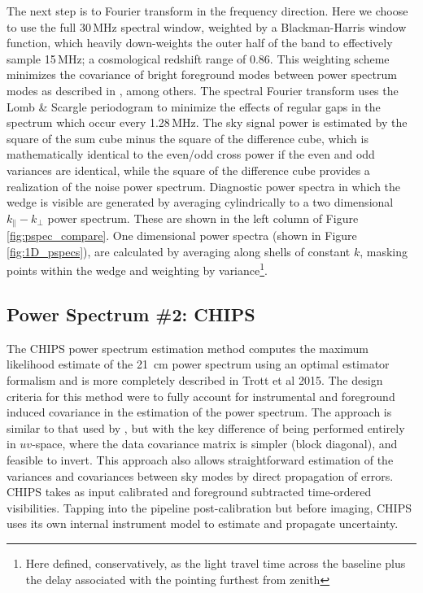 \documentclass[preprint2]{aastex}
\def\chipscite{Trott et al 2015}
\begin{document}
The next step is to Fourier transform in the frequency direction. Here we choose to use the full 30\,MHz spectral window, weighted by a Blackman-Harris window function, which heavily down-weights the outer half of the band to effectively sample 15\,MHz; a cosmological redshift range of 0.86. This weighting scheme minimizes the covariance of bright foreground modes between power spectrum modes as described in \cite{Thyagarajan:2013p10039,Parsons:2012p8896,Vedantham:2012p9026}, among others.  The spectral Fourier transform uses the Lomb \& Scargle periodogram to minimize the effects of regular gaps in the spectrum which occur every 1.28\,MHz.    The sky signal power is  estimated by the square of the sum cube minus the square of the difference cube, which  is mathematically identical to the even/odd cross power if the even and odd variances are identical, while the square of the difference cube provides a realization of the noise power spectrum. Diagnostic power spectra in which the wedge is visible are generated by averaging cylindrically to a two dimensional $k_{\|}-k_{\bot}$ power spectrum.  These are shown in the left column of Figure \ref{fig:pspec_compare}.  One dimensional power spectra (shown in Figure \ref{fig:1D_pspecs}), are calculated by averaging along shells of constant $k$, masking points within the wedge and weighting by variance\footnote{Here defined, conservatively, as the light travel time across the baseline plus the delay associated with the pointing furthest from zenith}.






\subsection{Power Spectrum \#2: CHIPS}
\label{sec:CHIPS}
The CHIPS power spectrum estimation method computes the maximum likelihood estimate of the 21~cm power spectrum using an optimal estimator formalism and is more completely described in \chipscite{}.  The design criteria for this method were to fully account for instrumental and foreground induced covariance in the estimation of the power spectrum.  The approach is similar to that used by \cite{Liu:2011p8763}, but with the key difference of being performed entirely in $uv$-space, where the data covariance matrix is simpler (block diagonal), and feasible to invert. This approach also allows straightforward estimation of the variances and covariances between sky modes by direct propagation of errors. CHIPS takes as input calibrated and foreground subtracted time-ordered visibilities. Tapping into the pipeline post-calibration but before imaging, CHIPS uses its own internal instrument model to estimate and propagate uncertainty.	
\end{document}
